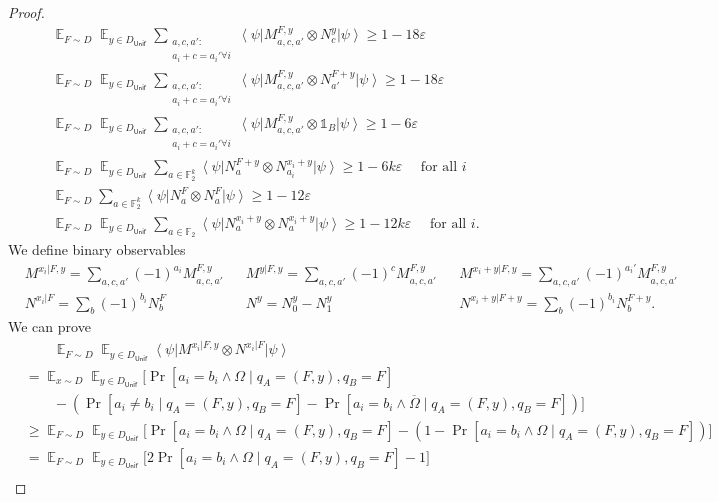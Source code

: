 \documentclass[11pt]{article}
\theoremstyle{plain}
\theoremstyle{definition}
\newcommand {\bra} [1] {\ensuremath{ \left\langle #1 \right| }}
\newcommand {\ket} [1] {\ensuremath{ \left| #1 \right\rangle }}
\DeclareMathOperator*{\bigE}{\mathbb{E}}
\newcommand {\id} {\ensuremath{\mathds{1}}}
\newcommand{\ep} {\ensuremath{\varepsilon}}
\newcommand{\x}{\otimes}
\newcommand{\1}{\mathbb{1}} %
\newcommand{\bF}{\mathbb{F}}
\newcommand{\Unif}{\mathsf{Unif}}
\begin{document}
\begin{proof}
\begin{align*}
	&\bigE_{F \sim D} \bigE_{y \in D_{\Unif}}  \sum_{\substack{a,c,a': \\ a_i + c = a_i' \forall i}} \bra{\psi} M^{F,y}_{a, c, a'} \x N^y_c \ket{\psi }\geq 1 - 18 \ep \\
	&\bigE_{F \sim D} \bigE_{y \in D_{\Unif}} \sum_{\substack{a,c,a': \\ a_i + c = a_i' \forall i}}\bra{\psi} M^{F,y}_{a, c, a'} \x N^{F+y}_{a'} \ket{\psi }  \geq 1 - 18 \ep \\
	&\bigE_{F \sim D} \bigE_{y \in D_{\Unif}} \sum_{\substack{a,c,a': \\ a_i + c = a_i' \forall i}} \bra{\psi} M^{F,y}_{a, c, a'} \x \id_B \ket{\psi } \geq 1 - 6\ep \\
	&\bigE_{F \sim D} \bigE_{y \in D_{\Unif}} \sum_{a \in \bF_2^k} \bra{\psi} N^{F+y}_a \x N^{x_i + y}_{a_i} \ket{\psi} \geq 1 - 6k \ep \quad\text{ for all } i\\
	&\bigE_{F \sim D} \sum_{a \in \bF_2^k} \bra{\psi} N^F_a \x N^F_a \ket{\psi} \geq 1 - 12\ep \\
	&\bigE_{F \sim D} \bigE_{y \in D_{\Unif}} \sum_{a \in \bF_2} \bra{\psi} N^{x_i+y}_a \x N^{x_i+y}_a \ket{\psi} \geq 1 - 12k\ep \quad\text{ for all } i.
\end{align*}
We define binary observables 
\begin{align*}
	&M^{x_i|F,y} = \sum_{a, c, a'} (-1)^{a_i} M^{F,y}_{a,c,a'} &&
	M^{y|F,y} = \sum_{a, c, a'} (-1)^{c} M^{F,y}_{a,c,a'} &&
	M^{x_i + y | F, y} = \sum_{a,c,a'} (-1)^{a_i'} M^{F,y}_{a,c,a'} \\
	&N^{x_i | F } = \sum_{b} (-1)^{b_i} N^F_b && 
	N^y = N^y_0 - N^y_1 &&
	N^{x_i+y | F+y} = \sum_{b} (-1)^{b_i} N^{F+y}_b.
\end{align*}
We can prove
\begin{align*}
	&\quad \quad \bigE_{F \sim D} \bigE_{y \in D_{\Unif}} \bra{\psi} M^{x_i| F, y} \x N^{x_i | F} \ket{\psi} \\
	& =\bigE_{x \sim D} \bigE_{y \in D_{\Unif}} \Big[ \Pr[a_i = b_i \land \Omega \mid q_A = (F,y), q_B = F] \\
	&\quad\quad- (\Pr[ a_i \neq b_i \mid q_A = (F,y),  q_B = F] - \Pr[ a_i = b_i \land \overline{\Omega} \mid q_A= (F,y), q_B= F]) \Big]\\
	& \geq \bigE_{F \sim D} \bigE_{y \in D_{\Unif}} \Big[\Pr[a_i = b_i \land \Omega \mid q_A = (F,y), q_B = F] - ( 1 - \Pr[a_i = b_i \land \Omega \mid q_A =(F,y), q_B = F]) \Big]\\
	& =\bigE_{F \sim D} \bigE_{y \in D_{\Unif}} \Big[ 2 \Pr[a_i = b_i \land \Omega \mid q_A = (F,y), q_B = F] - 1\Big] \\

\end{align*}
\end{proof}
\end{document}
